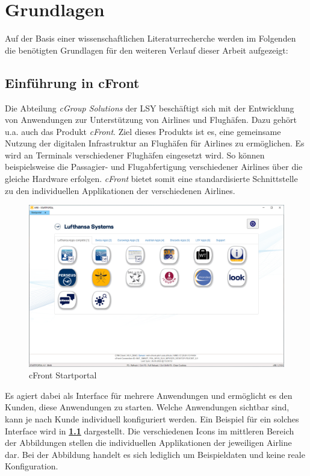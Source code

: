 
\chapter{Grundlagen}
Auf der Basis einer wissenschaftlichen Literaturrecherche werden im Folgenden die benötigten Grundlagen für den weiteren Verlauf dieser Arbeit aufgezeigt:

\section{Einführung in cFront} \label{cFront-exp}
Die Abteilung \textit{cGroup Solutions} der \ac{LSY} beschäftigt sich mit der Entwicklung von Anwendungen zur Unterstützung von Airlines und Flughäfen. Dazu gehört u.a. auch das Produkt \textit{cFront}. Ziel dieses Produkts ist es, eine gemeinsame Nutzung der digitalen Infrastruktur an Flughäfen für Airlines zu ermöglichen.
Es wird an Terminals verschiedener Flughäfen eingesetzt wird. So können beispielsweise die Passagier- und Flugabfertigung verschiedener Airlines über die gleiche Hardware erfolgen. \textit{cFront} bietet somit eine standardisierte Schnittstelle zu den individuellen Applikationen der verschiedenen Airlines.

\begin{figure}[h]
	\centering 
	\includegraphics[width=1\textwidth]{img/abbildungen/MicrosoftTeams-image (3).png}
	\captionsetup{format=hang}
	\caption{cFront Startportal} \label{cFront}
\end{figure}

Es agiert dabei als Interface für mehrere Anwendungen und ermöglicht es den Kunden, diese Anwendungen zu starten. Welche Anwendungen sichtbar sind, kann je nach Kunde individuell konfiguriert werden. Ein Beispiel für ein solches Interface wird in \textbf{\ref{cFront}} dargestellt.
Die verschiedenen Icons im mittleren Bereich der Abbildungen stellen die individuellen Applikationen der jeweiligen Airline dar. Bei der Abbildung handelt es sich lediglich um Beispieldaten und keine reale Konfiguration.


